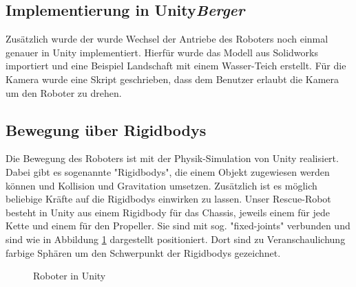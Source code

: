 \subsection{Implementierung in Unity\hfill\textnormal{\emph{Berger}}}
Zusätzlich wurde der wurde Wechsel der Antriebe des Roboters 
noch einmal genauer in Unity implementiert.
Hierfür wurde das Modell aus Solidworks importiert 
und eine Beispiel Landschaft mit einem Wasser-Teich erstellt.
Für die Kamera wurde eine Skript geschrieben, 
dass dem Benutzer erlaubt die Kamera um den Roboter zu drehen.

\subsection{Bewegung über Rigidbodys} \label{sec:rigidbody_switch}
Die Bewegung des Roboters ist mit der Physik-Simulation von Unity realisiert.
Dabei gibt es sogenannte "Rigidbodys", die einem Objekt zugewiesen werden können
und Kollision und Gravitation umsetzen.
Zusätzlich ist es möglich beliebige Kräfte auf die Rigidbodys einwirken zu lassen.
Unser Rescue-Robot besteht in Unity aus einem Rigidbody für das Chassis,
jeweils einem für jede Kette
und einem für den Propeller.
Sie sind mit sog. "fixed-joints" verbunden 
und sind wie in Abbildung \ref{fig:unity1} dargestellt positioniert.
Dort sind zu Veranschaulichung farbige Sphären um den Schwerpunkt der Rigidbodys gezeichnet.


\begin{figure}[H]
  \caption{Roboter in Unity}
  \label{fig:unity1}
\end{figure}


